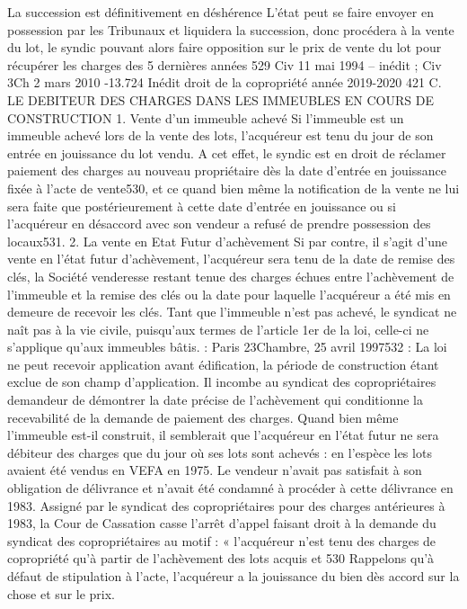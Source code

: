 La succession est définitivement en déshérence
L’état peut se faire envoyer en possession par les Tribunaux et liquidera la succession, donc procédera à la vente du lot, le syndic pouvant alors faire opposition sur le prix de vente du lot pour récupérer les charges des 5 dernières années
529 Civ 11 mai 1994 – inédit ; Civ 3\degres Ch 2 mars 2010 -13.724 Inédit
droit de la copropriété année 2019-2020
421
C. LE DEBITEUR DES CHARGES DANS LES IMMEUBLES EN COURS DE CONSTRUCTION
1. Vente d’un immeuble achevé
Si l'immeuble est un immeuble achevé lors de la vente des lots, l'acquéreur est tenu du jour de son entrée en jouissance du lot vendu.
A cet effet, le syndic est en droit de réclamer paiement des charges au nouveau propriétaire dès la date d'entrée en jouissance fixée à l'acte de vente530, et ce quand bien même la notification de la vente ne lui sera faite que postérieurement à cette date d'entrée en jouissance ou si l'acquéreur en désaccord avec son vendeur a refusé de prendre possession des locaux531.
2. La vente en Etat Futur d’achèvement
Si par contre, il s'agit d'une vente en l'état futur d'achèvement, l'acquéreur sera tenu de la date de remise des clés, la Société venderesse restant tenue des charges échues entre l'achèvement de l'immeuble et la remise des clés ou la date pour laquelle l'acquéreur a été mis en demeure de recevoir les clés.
Tant que l’immeuble n’est pas achevé, le syndicat ne naît pas à la vie civile, puisqu’aux termes de l’article 1er de la loi, celle-ci ne s’applique qu’aux immeubles bâtis. :
Paris 23\degres Chambre, 25 avril 1997532 :
La loi ne peut recevoir application avant édification, la période de construction étant exclue de son champ d’application. Il incombe au syndicat des copropriétaires demandeur de démontrer la date précise de l’achèvement qui conditionne la recevabilité de la demande de paiement des charges.
Quand bien même l’immeuble est-il construit, il semblerait que l’acquéreur en l’état futur ne sera débiteur des charges que du jour où ses lots sont achevés : en l’espèce les lots avaient été vendus en VEFA en 1975. Le vendeur n’avait pas satisfait à son obligation de délivrance et n’avait été condamné à procéder à cette délivrance en 1983. Assigné par le syndicat des copropriétaires pour des charges antérieures à 1983, la Cour de Cassation casse l’arrêt d’appel faisant droit à la demande du syndicat des copropriétaires au motif : « l'acquéreur n'est tenu des charges de copropriété qu'à partir de l'achèvement des lots acquis et
530 Rappelons qu’à défaut de stipulation à l’acte, l’acquéreur a la jouissance du bien dès accord sur la chose et sur le prix.
